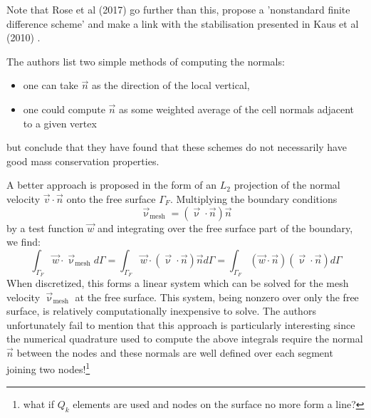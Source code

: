 Note that Rose et al (2017) \cite{robh17} go further than this, propose a 'nonstandard finite difference scheme' and make a link with the stabilisation presented in Kaus et al (2010) \cite{kamm10}.

The authors list two simple methods of computing the normals:
\begin{itemize}
\item one can take $\vec{n}$ as the direction of the local vertical,
\item one could compute $\vec{n}$ as some weighted average of the cell normals adjacent to a given
vertex
\end{itemize}
but conclude that they have found that these schemes do not necessarily
have good mass conservation properties.

A better approach is proposed in the form of an $L_2$ projection of the 
normal velocity $\vec{v}\cdot\vec{n}$ onto the free surface $\Gamma_F$. 
Multiplying the boundary conditions 
\[
\vec{\upnu}_{\text{mesh}} = (\vec{\upnu}\cdot\vec{n})\vec{n} 
\]
by a test function $\vec{w}$ and integrating over the free surface part of the boundary, we find:
\begin{equation}
\int_{\Gamma_F} \vec{w}\cdot\vec{\upnu}_{\text{mesh}} d\Gamma 
=
\int_{\Gamma_F} \vec{w}\cdot (\vec{\upnu}\cdot\vec{n})\vec{n} d\Gamma
=
\int_{\Gamma_F} (\vec{w}\cdot\vec{n}) (\vec{\upnu}\cdot\vec{n}) d\Gamma \label{eq:fsaspect3}
\end{equation}
When discretized, this forms a linear system which can be solved for the mesh velocity 
$\vec{\upnu}_{\text{mesh}}$ at the free surface. 
This system, being nonzero over only the free surface, is relatively computationally inexpensive to solve.
The authors unfortunately fail to mention that this approach is particularly 
interesting since  the numerical quadrature used to compute the above integrals
require the normal $\vec{n}$ between the nodes and these normals are well defined over each 
segment joining two nodes!\footnote{what if $Q_k$ elements are used and nodes on the surface
no more form a line?}


